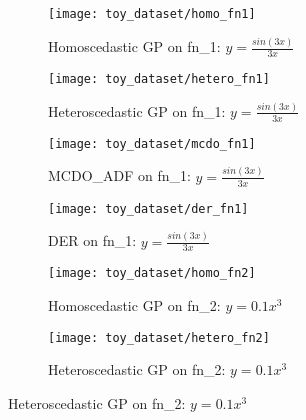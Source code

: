 \begin{figure}[H]
	\centering
	\begin{subfigure}[b]{0.4\textwidth}
		\centering
		\texttt{[image: toy\_dataset/homo\_fn1]}
		\caption{Homoscedastic GP on fn\_1: $y=\frac{sin(3x)}{3x}$}
		\label{homo_fn1}
	\end{subfigure}
	\hfill
	\begin{subfigure}[b]{0.4\textwidth}
		\centering
		\texttt{[image: toy\_dataset/hetero\_fn1]}
		\caption{Heteroscedastic GP on fn\_1: $y=\frac{sin(3x)}{3x}$}
		\label{hetero_fn1}
	\end{subfigure}
	\hfill
	\begin{subfigure}[b]{0.4\textwidth}
		\centering
		\texttt{[image: toy\_dataset/mcdo\_fn1]}
		\caption{MCDO\_ADF on fn\_1: $y=\frac{sin(3x)}{3x}$}
		\label{mcdo_fn1}
	\end{subfigure}
	\hfill
	\begin{subfigure}[b]{0.4\textwidth}
		\centering
		\texttt{[image: toy\_dataset/der\_fn1]}
		\caption{DER on fn\_1: $y=\frac{sin(3x)}{3x}$}
		\label{der_fn1}
	\end{subfigure}
	\hfill
	\begin{subfigure}[b]{0.4\textwidth}
		\centering
		\texttt{[image: toy\_dataset/homo\_fn2]}
		\caption{Homoscedastic GP on fn\_2: $y=0.1x^3$}
		\label{homo_fn2}
	\end{subfigure}
	\hfill
	\begin{subfigure}[b]{0.4\textwidth}
		\centering
		\texttt{[image: toy\_dataset/hetero\_fn2]}
		\caption{Heteroscedastic GP on fn\_2: $y=0.1x^3$}
		\label{hetero_fn2}
	\end{subfigure}
\end{figure}

